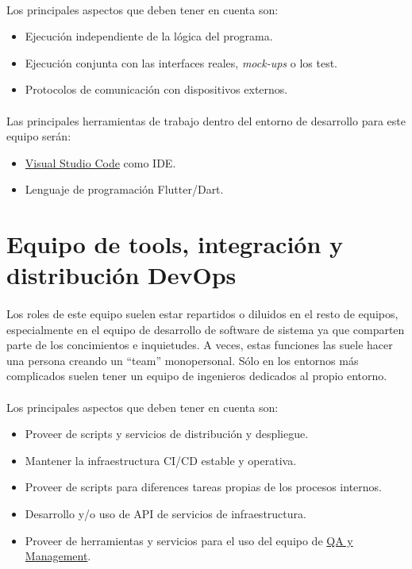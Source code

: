 \paragraph{}Los principales aspectos que deben tener en cuenta son:

\begin{itemize}
    \item Ejecución independiente de la lógica del programa.
    \item Ejecución conjunta con las interfaces reales, \emph{mock-ups} o los test.
    \item Protocolos de comunicación con dispositivos externos.
\end{itemize}

\paragraph{}Las principales herramientas de trabajo dentro del entorno de desarrollo
para este equipo serán:

\begin{itemize}
    \item \hyperref[sec:vscode]{Visual Studio Code} como \gls{IDE}.
    \item Lenguaje de programación Flutter/Dart.
\end{itemize}

\section{Equipo de tools, integración y distribución DevOps}

\paragraph{}Los roles de este equipo suelen estar repartidos o diluidos en el resto de
equipos, especialmente en el equipo de desarrollo de software de sistema ya que comparten
parte de los concimientos e inquietudes. A veces, estas funciones las suele hacer una
persona creando un ``team'' monopersonal. Sólo en los entornos más complicados suelen
tener un equipo de ingenieros dedicados al propio entorno.


\paragraph{}Los principales aspectos que deben tener en cuenta son:

\begin{itemize}
    \item Proveer de scripts y servicios de distribución y despliegue.
    \item Mantener la infraestructura \gls{CI/CD} estable y operativa.
    \item Proveer de scripts para diferences tareas propias de los procesos internos.
    \item Desarrollo y/o uso de \gls{API} de servicios de infraestructura.
    \item Proveer de herramientas y servicios para el uso del equipo de
    \hyperref[sec:testingqa]{QA y Management}.
\end{itemize}

